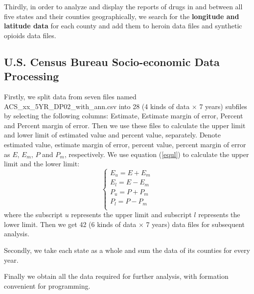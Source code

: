 \documentclass{mcmthesis}
\numberwithin{equation}{section}
\numberwithin{figure}{section}
\numberwithin{table}{section}
\theoremstyle{mydef}
\begin{document}
Thirdly, in order to analyze and display the reports of drugs in and between all five states and their counties geographically, we search for the {\bf {longitude and latitude data}} for each county and add them to heroin data files and synthetic opioids data files.

\subsection{U.S. Census Bureau Socio-economic Data Processing}

Firstly, we split data from seven files named ACS\_xx\_5YR\_DP02\_with\_ann.csv into 28 (4 kinds of data $\times$ 7 years) subfiles by selecting the following columns: Estimate, Estimate margin of error, Percent and Percent margin of error. Then we use these files to calculate the upper limit and lower limit of estimated value and percent value, separately. Denote estimated value, estimate margin of error, percent value, percent margin of error as $E$,  $E_m$, $P$ and $P_m$, respectively. We use equation (\ref{equl}) to calculate the upper limit and the lower limit:
\begin{equation}
\left\{
\begin{array}{l}
E_u=E+E_m\\
E_l = E-E_m\\
P_u = P+P_m\\
P_l=P-P_m\\ 
\end{array}
\right.
\label{equl}
\end{equation}
where the subscript $u$ represents the upper limit and subscript $l$ represents the lower limit. Then we get 42 (6 kinds of data $\times$ 7 years) data files for subsequent analysis.

Secondly, we take each state as a whole and sum the data of its counties for every year. 

Finally we obtain all the data required for further analysis, with formation convenient for programming.

%
\end{document}
